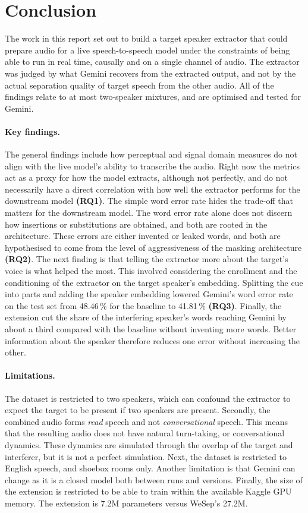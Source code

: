 \section{Conclusion}
\label{sec:conclusion}
The work in this report set out to build a target speaker extractor that could prepare audio for a live speech-to-speech model under the constraints of being able to run in real time, causally and on a single channel of audio. The extractor was judged by what Gemini recovers from the extracted output, and not by the actual separation quality of target speech from the other audio. All of the findings relate to at most two-speaker mixtures, and are optimised and tested for Gemini.
\paragraph{Key findings.}
 The general findings include how perceptual and signal domain measures do not align with the live model's ability to transcribe the audio. Right now the metrics act as a proxy for how the model extracts, although not perfectly, and do not necessarily have a direct correlation with how well the extractor performs for the downstream model \textbf{(RQ1)}. The simple word error rate hides the trade-off that matters for the downstream model. The word error rate alone does not discern how insertions or substitutions are obtained, and both are rooted in the architecture. These errors are either invented or leaked words, and both are hypothesised to come from the level of aggressiveness of the masking architecture \textbf{(RQ2)}. The next finding is that telling the extractor more about the target's voice is what helped the most. This involved considering the enrollment and the conditioning of the extractor on the target speaker's embedding. Splitting the cue into parts and adding the speaker embedding lowered Gemini's word error rate on the test set from 48.46\,\% for the baseline to 41.81\,\% \textbf{(RQ3)}. Finally, the extension cut the share of the interfering speaker's words reaching Gemini by about a third compared with the baseline without inventing more words. Better information about the speaker therefore reduces one error without increasing the other.

\paragraph{Limitations.}
 The dataset is restricted to two speakers, which can confound the extractor to expect the target to be present if two speakers are present. Secondly, the combined audio forms \emph{read} speech and not \emph{conversational} speech. This means that the resulting audio does not have natural turn-taking, or conversational dynamics. These dynamics are simulated through the overlap of the target and interferer, but it is not a perfect simulation. Next, the dataset is restricted to English speech, and shoebox rooms only. Another limitation is that Gemini can change as it is a closed model both between runs and versions. Finally, the size of the extension is restricted to be able to train within the available Kaggle GPU memory. The extension is 7.2M parameters versus WeSep's 27.2M. 

